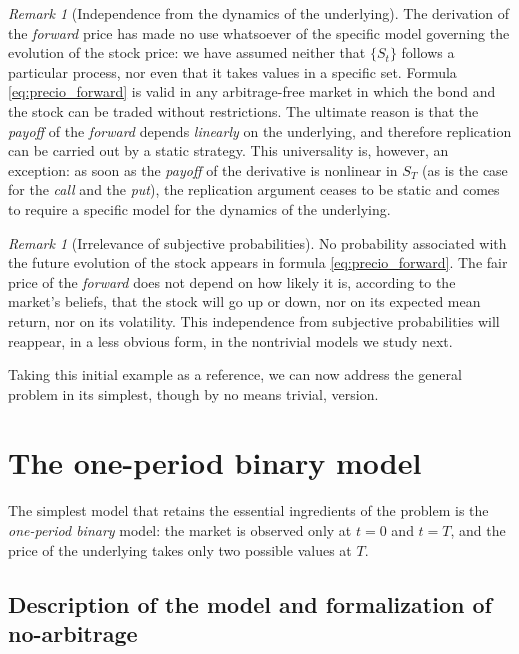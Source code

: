 \documentclass[11pt,a4paper,oneside]{report}
\theoremstyle{plain}
\theoremstyle{definition}
\theoremstyle{remark}
\newtheorem{observacion}[teorema]{Remark}
\newcommand{\1}{\mathbf{1}}
\begin{document}
\begin{observacion}[Independence from the dynamics of the underlying]
The derivation of the \emph{forward} price has made no use whatsoever
of the specific model governing the evolution of the stock price: we
have assumed neither that $\{S_t\}$ follows a particular process, nor
even that it takes values in a specific set. Formula
\eqref{eq:precio_forward} is valid in any arbitrage-free market in
which the bond and the stock can be traded without restrictions. The
ultimate reason is that the \emph{payoff} of the \emph{forward}
depends \emph{linearly} on the underlying, and therefore replication
can be carried out by a static strategy. This universality is,
however, an exception: as soon as the \emph{payoff} of the derivative
is nonlinear in $S_T$ (as is the case for the \emph{call} and the
\emph{put}), the replication argument ceases to be static and comes
to require a specific model for the dynamics of the underlying.
\end{observacion}

\begin{observacion}[Irrelevance of subjective probabilities]
No probability associated with the future evolution of the stock
appears in formula \eqref{eq:precio_forward}. The fair price of the
\emph{forward} does not depend on how likely it is, according to the
market's beliefs, that the stock will go up or down, nor on its
expected mean return, nor on its volatility. This independence from
subjective probabilities will reappear, in a less obvious form, in the
nontrivial models we study next.
\end{observacion}

Taking this initial example as a reference, we can now address the
general problem in its simplest, though by no means trivial, version.
\section{The one-period binary model}
\label{sec:binario}

The simplest model that retains the essential ingredients of the
problem is the \emph{one-period binary} model: the market is observed
only at $t = 0$ and $t = T$, and the price of the underlying takes only
two possible values at $T$.

\subsection{Description of the model and formalization of no-arbitrage}
\label{subsec:setup_binario}
\end{document}
